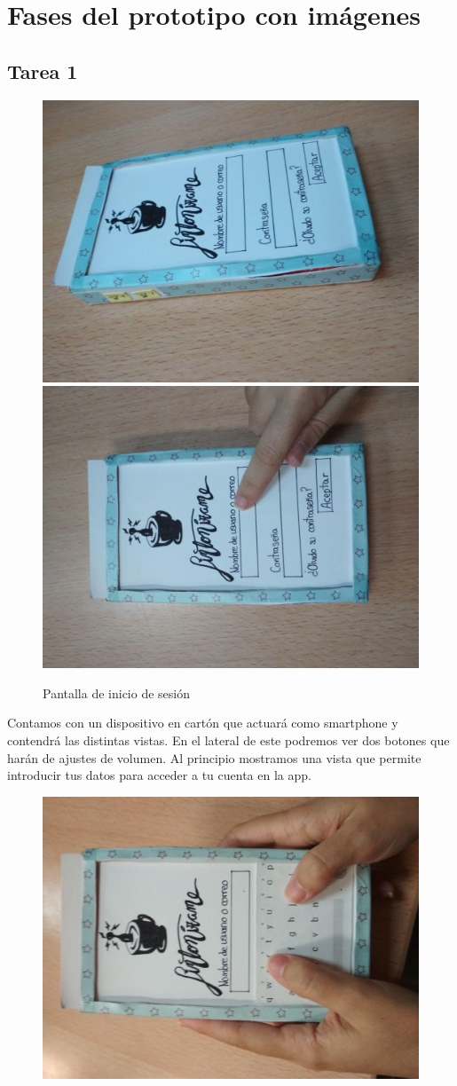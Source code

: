 \documentclass[a4paper]{article}
\begin{document}
\section{Fases del prototipo con imágenes}
\label{Fases del prototipo}

\subsection{Tarea 1}
\begin{center}
\begin{figure}[H]
\centering
\includegraphics[height=0.4\columnwidth,angle=-90]{T1-1.jpg}
\includegraphics[height=0.4\columnwidth,angle=-90]{T1-2.jpg}
\caption{Pantalla de inicio de sesión}
\label{fig:t1-1}
\end{figure}
Contamos con un dispositivo en cartón que actuará como smartphone y contendrá las distintas vistas. En el lateral de este podremos ver dos botones que harán de ajustes de volumen. Al principio mostramos una vista que permite introducir tus datos para acceder a tu cuenta en la app.
\begin{figure}[H]
\centering
\includegraphics[height=0.4\columnwidth,angle=-90]{T1-3.jpg}

\end{figure}
\end{center}
\end{document}
